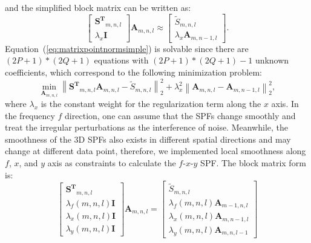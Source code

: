 and the simplified block matrix can be written as:
\begin{equation}
    \label{eq:matrixpointnormsimple}
    \begin{bmatrix}
        \mathbf{S^{T}}_{m,n,l} \\
        \lambda_{x} \mathbf{I}
    \end{bmatrix}
    \mathbf{A}_{m,n,l}
    \approx
    \begin{bmatrix}
        \tilde{S}_{m,n,l} \\
        \lambda_{x} \mathbf{A}_{m,n-1,l}
    \end{bmatrix}.
\end{equation}
Equation~(\ref{eq:matrixpointnormsimple}) is solvable since there are
$(2P+1)*(2Q+1)$ equations with $(2P+1)*(2Q+1)-1$ unknown coefficients,
which correspond to the following minimization problem:
\begin{equation}
    \label{eq:LS+x}
    \min_{\mathbf{A}_{m,n,l}} \left \|
    \mathbf{S^{T}}_{m,n,l} \mathbf{A}_{m,n,l}
    - \tilde{S}_{m,n,l} \right \|_{2}^{2}
    + \lambda_{x}^{2} \left \| \mathbf{A}_{m,n,l} - \mathbf{A}_{m,n-1,l}
    \right \|_{2}^{2},
\end{equation}
where $\lambda_{x}$ is the constant weight for the regularization term
along the $x$ axis. In the frequency $f$ direction, one can assume
that the SPFs change smoothly and treat the irregular perturbations as
the interference of noise. Meanwhile, the smoothness of the 3D SPFs
also exists in different spatial directions and may change at
different data point, therefore, we implemented local smoothness along
$f$, $x$, and $y$ axis as constraints to calculate the $f$-$x$-$y$
SPF. The block matrix form is:
\begin{equation}
    \label{eq:matrix2}
    \begin{bmatrix}
        \mathbf{S^{T}}_{m,n,l}        \\
        \lambda_{f}(m,n,l) \mathbf{I} \\
        \lambda_{x}(m,n,l) \mathbf{I} \\
        \lambda_{y}(m,n,l) \mathbf{I}
    \end{bmatrix}
    \mathbf{A}_{m,n,l} =
    \begin{bmatrix}
        \tilde{S}_{m,n,l}                       \\
        \lambda_{f}(m,n,l) \mathbf{A}_{m-1,n,l} \\
        \lambda_{x}(m,n,l) \mathbf{A}_{m,n-1,l} \\
        \lambda_{y}(m,n,l) \mathbf{A}_{m,n,l-1}
    \end{bmatrix}
\end{equation}
